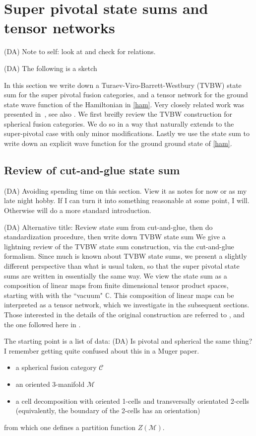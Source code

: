 \documentclass[12pt,a4paper]{article}
\newcommand{\cc}{\mathbb{C}}
\newcommand{\mcc}{\mathcal{C}}
\newcommand{\mcm}{\mathcal{M}}
\newcommand{\dave}[1]{{\color{ao(english)}\footnotesize{(DA) #1}}}
\begin{document}
\section{Super pivotal state sums and tensor networks} 
\label{state_sums}
\dave{Note to self: look at \cite{beliakova1998} and check for relations.}

\dave{The following is a sketch}

In this section we write down a Turaev-Viro-Barrett-Westbury (TVBW) state sum for the super pivotal fusion categories\cite{Turaev1992,Barrett1996}, 
and a tensor network for the ground state wave function of the Hamiltonian in \eqref{ham}.
Very closely related work was presented in~\cite{bhardwaj2016}, 
see also \cite{Bultinck2017, upcoming-paper?}.
We first breifly review the TVBW construction for spherical fusion categories. 
We do so in a way that naturally extends to the super-pivotal case with only minor modifications.
Lastly we use the state sum to write down an explicit wave function for the ground ground state of \eqref{ham}.

\subsection{Review of cut-and-glue state sum}
\dave{Avoiding spending time on this section. 
View it as notes for now or as my late night hobby.
If I can turn it into something reasonable at some point, I will. 
Otherwise will do a more standard introduction.}

\dave{Alternative title: Review state sum from cut-and-glue,
then do standardization procedure,
then write down TVBW state sum}
We give a lightning review of the TVBW state sum construction, via the cut-and-glue formalism.
Since much is known about TVBW state sums, 
we present a slightly different perspective than what is usual taken,
so that the super pivotal state sums are written in essentially the same way.
We view the state sum as a composition of linear maps from finite dimensional tensor product spaces, starting with with the ``vacuum" $\cc$. 
This composition of linear maps can be interpreted as a tensor network, 
which we investigate in the subsequent sections.
Those interested in the details of the original construction are referred to \cite{Turaev1992,Barrett1996}, 
and the one followed here in \cite{Walker2006}. 

The starting point is a list of data:
\dave{Is pivotal and spherical the same thing?
I remember getting quite confused about this in a Muger paper.}
\begin{itemize}
\item a spherical fusion category $\mcc$
\item an oriented 3-manifold $\mcm$
\item a cell decomposition with oriented 1-cells and transversally orientated 2-cells (equivalently, the boundary of the 2-cells has an orientation)
\end{itemize} 
from which one defines a partition function $Z(\mcm)$. 
\end{document}
